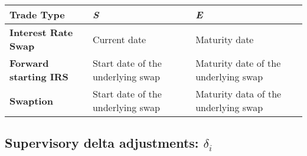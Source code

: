 \begin{longtable}[]{@{}lll@{}}
\toprule
\begin{minipage}[b]{0.24\columnwidth}\raggedright
Trade Type\strut
\end{minipage} & \begin{minipage}[b]{0.32\columnwidth}\raggedright
\emph{S}\strut
\end{minipage} & \begin{minipage}[b]{0.36\columnwidth}\raggedright
\emph{E}\strut
\end{minipage}\tabularnewline
\midrule
\endhead
\begin{minipage}[t]{0.24\columnwidth}\raggedright
\textbf{Interest Rate Swap}\strut
\end{minipage} & \begin{minipage}[t]{0.32\columnwidth}\raggedright
Current date\strut
\end{minipage} & \begin{minipage}[t]{0.36\columnwidth}\raggedright
Maturity date\strut
\end{minipage}\tabularnewline
\begin{minipage}[t]{0.24\columnwidth}\raggedright
\textbf{Forward starting IRS}\strut
\end{minipage} & \begin{minipage}[t]{0.32\columnwidth}\raggedright
Start date of the underlying swap\strut
\end{minipage} & \begin{minipage}[t]{0.36\columnwidth}\raggedright
Maturity date of the underlying swap\strut
\end{minipage}\tabularnewline
\begin{minipage}[t]{0.24\columnwidth}\raggedright
\textbf{Swaption}\strut
\end{minipage} & \begin{minipage}[t]{0.32\columnwidth}\raggedright
Start date of the underlying swap\strut
\end{minipage} & \begin{minipage}[t]{0.36\columnwidth}\raggedright
Maturity data of the underlying swap\strut
\end{minipage}\tabularnewline
\bottomrule
\end{longtable}

    \hypertarget{supervisory-delta-adjustments-delta_i}{%
\subsection{\texorpdfstring{Supervisory delta adjustments:
\(\delta_i\)}{Supervisory delta adjustments: \textbackslash{}delta\_i}}\label{supervisory-delta-adjustments-delta_i}}

